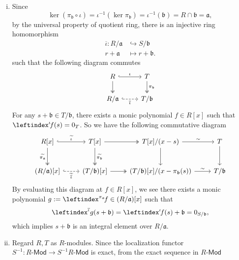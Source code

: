 \begin{prf}
    \begin{enumerate}[(i)]
        \item Since 
    \[
    \ker (\pi_{\mathfrak{b}}\circ \iota )= \iota^{-1}\left(\ker \pi_{\mathfrak{b}}\right)=\iota^{-1}\left(\mathfrak{b}\right)=R \cap \mathfrak{b}=\mathfrak{a},
    \]
    by the universal property of quotient ring, there is an injective ring homomorphism 
    \begin{align*}
        \overline{\iota}:R/\mathfrak{a}&\hookrightarrow S/\mathfrak{b}\\
        r+\mathfrak{a}&\longmapsto r+\mathfrak{b}.
    \end{align*} such that the following diagram commutes
    \[
        \begin{tikzcd}
            R \arrow[r, "\iota", hook] \arrow[d, two heads] & T \arrow[d, "\pi_{\mathfrak{b}}", two heads] \\
            R/\mathfrak{a} \arrow[r, "\overline{\iota}"', dashed, hook]                & T/\mathfrak{b}             
            \end{tikzcd}
    \]
    For any $s + \mathfrak{b}\in T/\mathfrak{b}$, there exists a monic polynomial $f\in R[x]$ such that $\leftindex^{\iota}\!f(s)=0_T$. So we have the following commutative diagram
    \[
        \begin{tikzcd}
            {R[x]} \arrow[r, "\widetilde{\iota}", hook] \arrow[d, "\widetilde{\pi_\mathfrak{a}}"', two heads] & {T[x]} \arrow[d, "\widetilde{\pi_\mathfrak{b}}", two heads] \arrow[r, two heads] & {T[x]/(x-s)} \arrow[d] \arrow[r, "\sim"]           & T \arrow[d]    \\[0.8em]
            {(R/\mathfrak{a})[x]} \arrow[r, "\widetilde{\overline{\iota}}"', dashed, hook]                    & {(T/\mathfrak{b})[x]} \arrow[r, two heads]                                       & {(T/\mathfrak{b})[x]/(x-\pi_{\mathfrak{b}}(s))} \arrow[r, "\sim"] & T/\mathfrak{b}
            \end{tikzcd}
    \]
    By evaluating this diagram at $f \in R[x]$, we see there exists a monic polynomial $g:=\leftindex^{\pi_\mathfrak{a}}\!f \in (R/\mathfrak{a})[x]$ such that 
    \[
    \leftindex^{\overline{\iota}}g(s+\mathfrak{b})=\leftindex^{\iota}\!f(s)+\mathfrak{b}=0_{S/\mathfrak{b}},
    \]
    which implies $s+\mathfrak{b}$ is an integral element over $R/\mathfrak{a}$.
    \item Regard $R,T$ as $R$-modules. Since the localization functor $S^{-1}:R\text{-}\mathsf{Mod}\to S^{-1}R\text{-}\mathsf{Mod}$ is exact, from the exact sequence in $R\text{-}\mathsf{Mod}$

\end{enumerate}
\end{prf}
